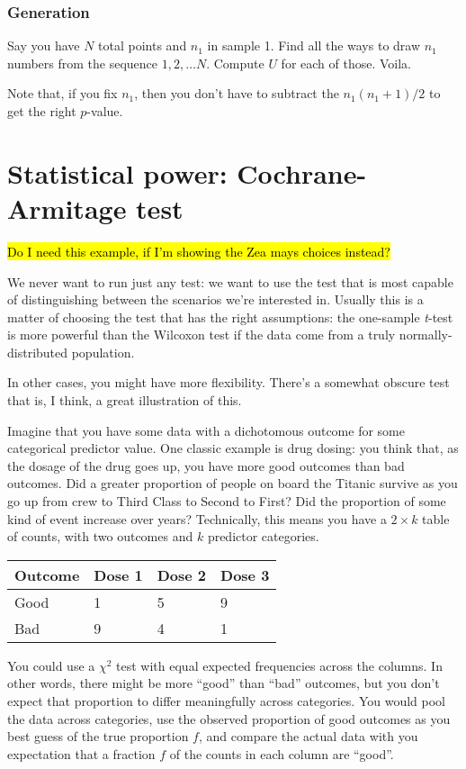 \subsubsection{Generation}\label{generation}

Say you have \(N\) total points and \(n_1\) in sample 1. Find all the
ways to draw \(n_1\) numbers from the sequence \(1, 2, \ldots N\).
Compute \(U\) for each of those. Voila.

Note that, if you fix \(n_1\), then you don't have to subtract the
\(n_1(n_1+1)/2\) to get the right \(p\)-value.

\section{Statistical power: Cochrane-Armitage
test}\label{statistical-power-cochrane-armitage-test}

\hl{Do I need this example, if I'm showing the Zea mays choices instead?}

We never want to run just any test: we want to use the test that is most
capable of distinguishing between the scenarios we're interested in.
Usually this is a matter of choosing the test that has the right
assumptions: the one-sample \emph{t}-test is more powerful than the
Wilcoxon test if the data come from a truly normally-distributed
population.

In other cases, you might have more flexibility. There's a somewhat
obscure test that is, I think, a great illustration of this.

Imagine that you have some data with a dichotomous outcome for some
categorical predictor value. One classic example is drug dosing: you
think that, as the dosage of the drug goes up, you have more good
outcomes than bad outcomes. Did a greater proportion of people on board
the Titanic survive as you go up from crew to Third Class to Second to
First? Did the proportion of some kind of event increase over years?
Technically, this means you have a \(2 \times k\) table of counts, with
two outcomes and \(k\) predictor categories.

\begin{longtable}[]{@{}llll@{}}
\toprule
Outcome & Dose 1 & Dose 2 & Dose 3\tabularnewline
\midrule
\endhead
Good & 1 & 5 & 9\tabularnewline
Bad & 9 & 4 & 1\tabularnewline
\bottomrule
\end{longtable}

You could use a \(\chi^2\) test with equal expected frequencies across
the columns. In other words, there might be more ``good'' than ``bad''
outcomes, but you don't expect that proportion to differ meaningfully
across categories. You would pool the data across categories, use the
observed proportion of good outcomes as you best guess of the true
proportion \(f\), and compare the actual data with you expectation that
a fraction \(f\) of the counts in each column are ``good''.

